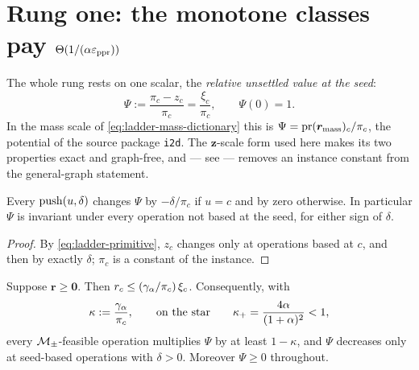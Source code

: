 \section[Rung one: monotone-class work]
{Rung one: the monotone classes pay $\Theta(1/(\alpha\varepsilon_{\mathrm{ppr}}))$}
\label{sec:ladder-monotone-lower-bound}

The whole rung rests on one scalar, the \emph{relative unsettled value at the
seed}:
\begin{equation}
    \Psi:=\frac{\pi_{c}-z_{c}}{\pi_{c}}=\frac{\xi_{c}}{\pi_{c}},
    \qquad
    \Psi(0)=1 .
    \label{eq:ladder-potential}
\end{equation}
In the mass scale of \eqref{eq:ladder-mass-dictionary} this is
$\Psi=\operatorname{pr}(\bm{r}_{\mathrm{mass}})_{c}/\pi_{c}$, the potential of the source
package \texttt{i2d}. The $\bm{z}$-scale form used here makes its two properties
exact and graph-free, and --- see  --- removes
an instance constant from the general-graph statement.

\begin{lemma}
\label{lem:ladder-locality}
Every $\operatorname{push}(u,\delta)$ changes $\Psi$ by $-\delta/\pi_{c}$ if $u=c$ and by
zero otherwise. In particular $\Psi$ is invariant under every operation not
based at the seed, for either sign of $\delta$.
\end{lemma}

\begin{proof}
By \eqref{eq:ladder-primitive}, $z_{c}$ changes only at operations based at
$c$, and then by exactly $\delta$; $\pi_{c}$ is a constant of the instance.
\end{proof}

\begin{lemma}
\label{lem:ladder-kappa-step}
Suppose $\bm{r}\ge\bm{0}$. Then
$r_{c}\le(\gamma_{\alpha}/\pi_{c})\,\xi_{c}$. Consequently, with
\begin{equation}
    \kappa:=\frac{\gamma_{\alpha}}{\pi_{c}},
    \qquad\text{on the star}\qquad
    \kappa_{+}=\frac{4\alpha}{(1+\alpha)^{2}}<1,
    \label{eq:ladder-kappa}
\end{equation}
every $\mathcal{M}_{\pm}$-feasible operation multiplies $\Psi$ by at least $1-\kappa$, and
$\Psi$ decreases only at seed-based operations with $\delta>0$. Moreover
$\Psi\ge0$ throughout.
\end{lemma}

